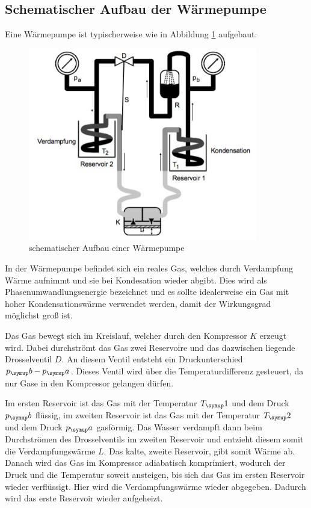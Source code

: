 \subsection{Schematischer Aufbau der Wärmepumpe}
Eine Wärmepumpe ist typischerweise wie in Abbildung \ref{fig:1} aufgebaut.
\begin{figure}
\centering
\includegraphics[width=10cm]{Bilder/schema.jpg}
\caption{schematischer Aufbau einer Wärmepumpe\,\cite{206}}
\label{fig:1}
\end{figure}
In der Wärmepumpe befindet sich ein reales Gas, welches durch Verdampfung Wärme aufnimmt
und sie bei Kondesation wieder abgibt. Dies wird als Phasenumwandlungsenergie bezeichnet
und es sollte idealerweise ein Gas mit hoher Kondensationswärme verwendet werden, damit
der Wirkungsgrad möglichst groß ist.

Das Gas bewegt sich im Kreislauf, welcher durch den Kompressor $K$ erzeugt wird. Dabei
durchströmt das Gas zwei Reservoire und das dazwischen liegende Drosselventil $D$.
An diesem Ventil entsteht ein Druckunterschied $p_\su{b}-p_\su{a}$. Dieses Ventil wird
über die Temperaturdifferenz gesteuert, da nur Gase in den Kompressor gelangen dürfen.

Im ersten Reservoir ist das Gas mit der Temperatur $T_\su{1}$ und dem Druck $p_\su{b}$
flüssig, im zweiten Reservoir ist das Gas mit der Temperatur $T_\su{2}$ und dem Druck
$p_\su{a}$ gasförmig. Das Wasser verdampft dann beim Durchströmen des Drosselventils
im zweiten Reservoir und entzieht diesem somit die Verdampfungswärme $L$. Das kalte, zweite
Reservoir, gibt somit Wärme ab.
Danach wird das Gas im Kompressor adiabatisch komprimiert, wodurch der Druck und die Temperatur
soweit ansteigen, bis sich das Gas im ersten Reservoir wieder verflüssigt. Hier wird die
Verdampfungswärme wieder abgegeben. Dadurch wird das erste Reservoir wieder aufgeheizt.

